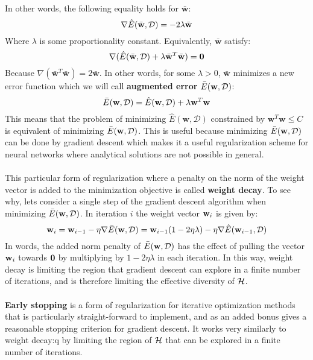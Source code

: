 In other words, the following equality holds for $\bar{\mathbf{w}}$:
$$
\nabla \hat{E}(\bar{\mathbf{w}}, \mathcal{D}) = -2\lambda\bar{\mathbf{w}}
$$
Where $\lambda$ is some proportionality constant. Equivalently, $\bar{\mathbf{w}}$ satisfy:
$$
\nabla (\hat{E}(\bar{\mathbf{w}}, \mathcal{D}) + \lambda\bar{\mathbf{w}}^T\bar{\mathbf{w}}) = \mathbf{0}
$$
Because $\nabla(\bar{\mathbf{w}}^T\bar{\mathbf{w}}) = 2\bar{\mathbf{w}}$. In other words, for some $\lambda > 0$, $\bar{\mathbf{w}}$ minimizes a new error function which we will call \textbf{augmented error} $\bar{E}(\mathbf{w}, \mathcal{D})$:
$$
\bar{E}(\mathbf{w}, \mathcal{D}) = \hat{E}(\mathbf{w}, \mathcal{D}) + \lambda\mathbf{w}^T\mathbf{w}
$$
This means that the problem of minimizing $\hat{E}(\mathbf{w}, \mathcal{D})$ constrained by $\mathbf{w}^T\mathbf{w} \leq C$ is equivalent of minimizing $\bar{E}(\mathbf{w}, \mathcal{D})$. This is useful because minimizing $\bar{E}(\mathbf{w}, \mathcal{D})$ can be done by gradient descent which makes it a useful regularization scheme for neural networks where analytical solutions are not possible in general.
\\\\
This particular form of regularization where a penalty on the norm of the weight vector is added to the minimization objective is called \textbf{weight decay}. To see why, lets consider a single step of the gradient descent algorithm when minimizing $\bar{E}(\mathbf{w}, \mathcal{D})$. In iteration $i$ the weight vector $\mathbf{w}_i$ is given by:
$$
\mathbf{w}_i = \mathbf{w}_{i-1} - \eta \nabla \bar{E}(\mathbf{w}, \mathcal{D}) = \mathbf{w}_{i-1}(1 - 2\eta\lambda) - \eta \nabla \hat{E}(\mathbf{w}_{i-1}, \mathcal{D})	
$$
In words, the added norm penalty of $\bar{E}(\mathbf{w}, \mathcal{D})$ has the effect of pulling the vector $\mathbf{w}_i$ towards $\mathbf{0}$ by multiplying by $1 - 2\eta\lambda$ in each iteration. In this way, weight decay is limiting the region that gradient descent can explore in a finite number of iterations, and is therefore limiting the effective diversity of $\mathcal{H}$.
\\\\
\textbf{Early stopping} is a form of regularization for iterative optimization methods that is particularly straight-forward to implement, and as an added bonus gives a reasonable stopping criterion for gradient descent. It works very similarly to weight decay:q by limiting the region of $\mathcal{H}$ that can be explored in a finite number of iterations.

